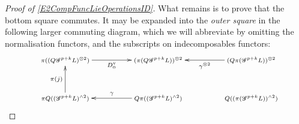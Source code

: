 \documentclass[11pt]{amsart}
\theoremstyle{plain}
\theoremstyle{definition}
\newcommand{\scrQ}{\mathscr{Q}}
\newcommand{\scrR}{\mathscr{R}}
\newcommand{\scrT}{\mathscr{T}}
\newcommand{\scrY}{\mathscr{Y}}
\newcommand{\scrI}{\mathscr{I}}
\newcommand{\scrO}{\mathscr{O}}
\newcommand{\scrP}{\mathscr{P}}
\newcommand{\scrS}{\mathscr{S}}
\newcommand{\scrG}{\mathscr{G}}
\newcommand{\scrH}{\mathscr{H}}
\newcommand{\scrJ}{\mathscr{J}}
\newcommand{\scrK}{\mathscr{K}}
\newcommand{\scrL}{\mathscr{L}}
\newcommand{\scrZ}{\mathscr{Z}}
\newcommand{\scrN}{\mathscr{N}}
\newcommand{\scrM}{\mathscr{M}}
\newcommand{\calW}{\mathcal{W}}
\theoremstyle{plain}
\newcommand{\BSW}{{\scrG}}%
\begin{document}
\begin{Composite functor spectral sequences}
\begin{tricky proofs of operation compatibilities}
\begin{proof}[Proof of \ref{E2CompFuncLieOperationsID}]
What remains is to prove that the bottom square commutes. It may be expanded into the \emph{outer square} in the following larger commuting diagram, which we will abbreviate by omitting the normalisation functors, and the subscripts on indecomposables functors:
\[
\def\objectstyle{\scriptstyle}
\xymatrix@R=8mm@C=13mm@!0{
&%
\pi((Q\BSW^{p+k}L)^{\otimes2}) \ar[rrr]_-{D_0^{\textup{v}}}
&%
&%
&%
(\pi (Q\BSW^{p+k}L))^{\otimes2}&%
&%
&%
(Q\pi(\BSW^{p+k}L))^{\otimes2} \ar[lll]^-{\gamma^{\otimes2}}\\\\%
&%
\pi Q((\BSW^{p+k}L)^{\wedge 2})\ar[uu]^-{\pi(j)}
&%
&%
&%
Q\pi((\BSW^{p+k}L)^{\wedge 2})\ar[lll]_-{\gamma}
&%
&%
&%
Q((\pi( \BSW^{p+k}L))^{\wedge 2})
}\]
\end{proof}
\end{tricky proofs of operation compatibilities}
\end{Composite functor spectral sequences}
\end{document}

